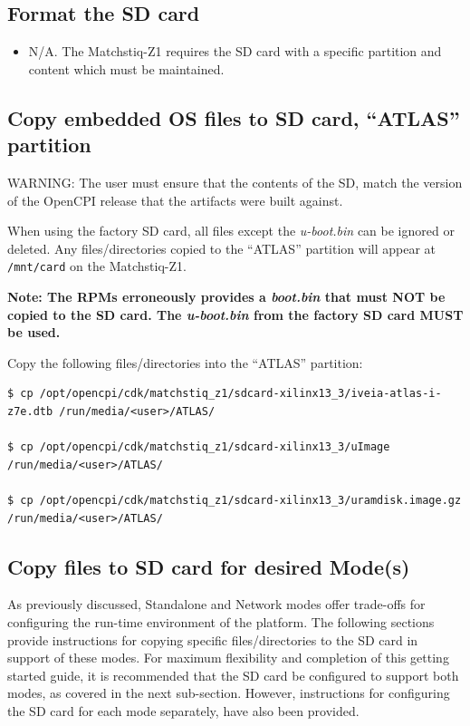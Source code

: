 \subsection{Format the SD card}
\begin{itemize}
\item N/A. The Matchstiq-Z1 requires the SD card with a specific partition and content which must be maintained.
\end{itemize}

\subsection{Copy embedded OS files to SD card, ``ATLAS'' partition}
\label{sec:Copy embedded OS to SD card}
\begin{flushleft}

WARNING: The user must ensure that the contents of the SD, match the version of the OpenCPI release that the artifacts were built against.\\ \medskip

When using the factory SD card, all files except the \textit{u-boot.bin} can be ignored or deleted. Any files/directories copied to the ``ATLAS'' partition will appear at \texttt{/mnt/card} on the Matchstiq-Z1.\\ \medskip

\textbf{Note: The RPMs erroneously provides a \textit{boot.bin} that must NOT be copied to the SD card. The \textit{u-boot.bin} from the factory SD card MUST be used.}\\ \medskip

Copy the following files/directories into the ``ATLAS'' partition:
\begin{verbatim}
$ cp /opt/opencpi/cdk/matchstiq_z1/sdcard-xilinx13_3/iveia-atlas-i-z7e.dtb /run/media/<user>/ATLAS/

$ cp /opt/opencpi/cdk/matchstiq_z1/sdcard-xilinx13_3/uImage /run/media/<user>/ATLAS/

$ cp /opt/opencpi/cdk/matchstiq_z1/sdcard-xilinx13_3/uramdisk.image.gz /run/media/<user>/ATLAS/
\end{verbatim}\medskip
\end{flushleft}

\subsection{Copy files to SD card for desired Mode(s)}
As previously discussed, Standalone and Network modes offer trade-offs for configuring the run-time environment of the platform. The following sections provide instructions for copying specific files/directories to the SD card in support of these modes. For maximum flexibility and completion of this getting started guide, it is recommended that the SD card be configured to support both modes, as covered in the next sub-section. However, instructions for configuring the SD card for each mode separately, have also been provided.

